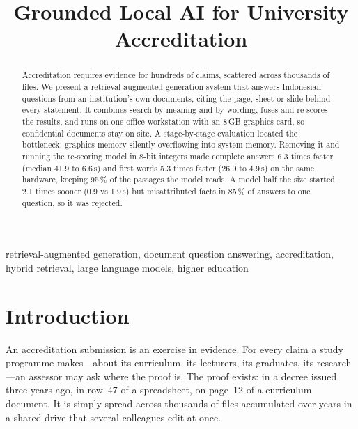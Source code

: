 \documentclass[conference]{IEEEtran}
\begin{document}
\title{Grounded Local AI for University Accreditation}

\author{
}

\maketitle

\begin{abstract}
Accreditation requires evidence for hundreds of claims, scattered across
thousands of files. We present a retrieval-augmented generation system that
answers Indonesian questions from an institution's own documents, citing the
page, sheet or slide behind every statement. It combines search by meaning and
by wording, fuses and re-scores the results, and runs on one office
workstation with an 8\,GB graphics card, so confidential documents stay on
site. A stage-by-stage evaluation located the bottleneck: graphics memory
silently overflowing into system memory. Removing it and running the
re-scoring model in 8-bit integers made complete answers 6.3 times faster
(median 41.9 to 6.6\,s) and first words 5.3 times faster (26.0 to 4.9\,s) on
the same hardware, keeping 95\,\% of the passages the model reads. A model half
the size started 2.1 times sooner (0.9 vs 1.9\,s) but misattributed facts in
85\,\% of answers to one question, so it was rejected.
\end{abstract}

\begin{IEEEkeywords}
retrieval-augmented generation, document question answering, accreditation,
hybrid retrieval, large language models, higher education
\end{IEEEkeywords}

\section{Introduction}

An accreditation submission is an exercise in evidence. For every claim a study
programme makes---about its curriculum, its lecturers, its graduates, its
research---an assessor may ask where the proof is. The proof exists: in a decree
issued three years ago, in row~47 of a spreadsheet, on page~12 of a curriculum
document. It is simply spread across thousands of files accumulated over years
in a shared drive that several colleagues edit at once.
\end{document}
